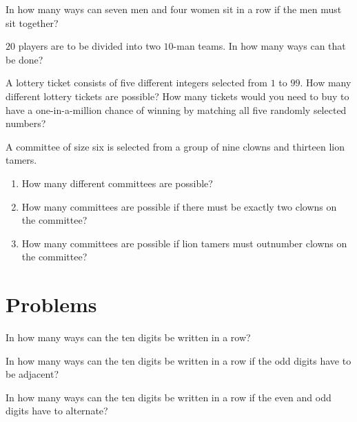 \begin{exer}
In how many ways can  seven men and four women sit in a row if the
men must sit together?
\end{exer}

\begin{exer}
$20$ players are to be divided into two $10$-man teams. In how many
ways can that be done?
\end{exer}

\begin{exer}
A lottery ticket consists of five different integers selected from $1$ to $99$.
How many different lottery tickets are possible? How many tickets would you need
to buy to have a one-in-a-million chance of winning by matching all five randomly
selected numbers?
\end{exer}

\begin{exer}
A committee of size six is selected from a group of nine clowns and
thirteen  lion tamers. 
\begin{enumerate}[label=(\alph*)]
 \item How many different committees are possible?
 
 \item How many committees are possible if there must be exactly two clowns
 on the committee?
 
 \item How many committees are possible if lion tamers must outnumber clowns
 on the committee?
\end{enumerate}
\end{exer}

\section{Problems}

\begin{prob}
In how many ways can the ten digits be written in a row?
\end{prob}


\begin{prob}
In how many ways can the ten digits be written in a row if the odd digits have to be adjacent?
\end{prob}


\begin{prob}
In how many ways can the ten digits be written in a row if the even and odd digits have to alternate?
\end{prob}


